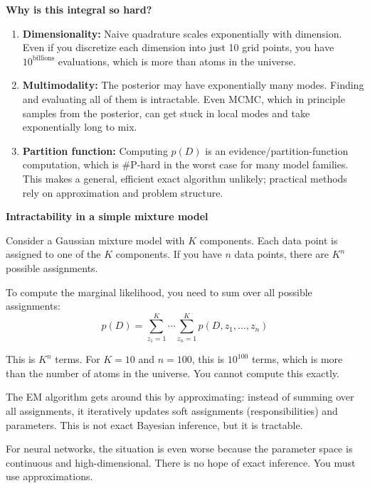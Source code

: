 \textbf{Why is this integral so hard?}

\begin{enumerate}
\item \textbf{Dimensionality:} Naive quadrature scales exponentially with dimension. Even if you discretize each dimension into just 10 grid points, you have $10^{\text{billions}}$ evaluations, which is more than atoms in the universe.

\item \textbf{Multimodality:} The posterior may have exponentially many modes. Finding and evaluating all of them is intractable. Even MCMC, which in principle samples from the posterior, can get stuck in local modes and take exponentially long to mix.

\item \textbf{Partition function:} Computing $p(D)$ is an evidence/partition-function computation, which is \#P-hard in the worst case for many model families. This makes a general, efficient exact algorithm unlikely; practical methods rely on approximation and problem structure.
\end{enumerate}

\vspace{1.5em}

\begin{examplebox}
\textbf{Intractability in a simple mixture model}

\vspace{0.5em}

Consider a Gaussian mixture model with $K$ components. Each data point is assigned to one of the $K$ components. If you have $n$ data points, there are $K^n$ possible assignments.

\vspace{0.5em}

To compute the marginal likelihood, you need to sum over all possible assignments:
\begin{equation*}
p(D) = \sum_{z_1=1}^{K} \cdots \sum_{z_n=1}^{K} p(D, z_1, \ldots, z_n)
\end{equation*}

This is $K^n$ terms. For $K=10$ and $n=100$, this is $10^{100}$ terms, which is more than the number of atoms in the universe. You cannot compute this exactly.

\vspace{0.5em}

The EM algorithm gets around this by approximating: instead of summing over all assignments, it iteratively updates soft assignments (responsibilities) and parameters. This is not exact Bayesian inference, but it is tractable.

\vspace{0.5em}

For neural networks, the situation is even worse because the parameter space is continuous and high-dimensional. There is no hope of exact inference. You must use approximations.
\end{examplebox}

